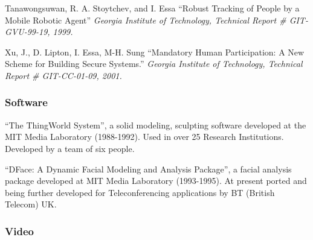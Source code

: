 \begin{pub}

\item Tanawongsuwan, R. A. Stoytchev, and I. Essa ``Robust Tracking of People by a
Mobile Robotic Agent'' \textit{Georgia Institute of Technology,
Technical Report \# GIT-GVU-99-19, 1999.} \label{pub:pepe1999a}

\item Xu, J., D. Lipton, I. Essa, M-H. Sung ``Mandatory
Human Participation: A New Scheme for Building Secure Systems.''
\textit{Georgia Institute of Technology, Technical Report \#
GIT-CC-01-09, 2001.} \label{pub:xu01a}

%
%

\end{pub}



\subsubsection{Software}
\label{subsubsec:softwaredl}

\begin{pub}

\item ``The ThingWorld System'', a solid modeling, sculpting software developed at
the MIT Media Laboratory (1988-1992). Used in over 25 Research Institutions.
Developed by a team of six people.

\item ``DFace: A Dynamic Facial Modeling and Analysis Package'', a facial analysis
package developed at MIT Media Laboratory (1993-1995). At present ported and
being further developed for Teleconferencing applications by BT (British
Telecom) UK.

\end{pub}

\subsubsection{Video}
\label{subsubsec:videoce}

